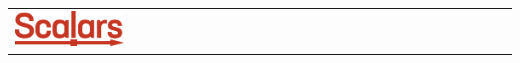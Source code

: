 



    \noindent
    \begin{tabularx}{\textwidth}{X r}
        \hspace{-0.1in}
        \begin{adjustbox}{valign=t}
            \includegraphics[width=0.23\textwidth]{img/scalars_logo.png}
        \end{adjustbox}
        \multirow{3}{0.75\textwidth}{
            \raggedleft\large\textbf{\doctitle} \\
            \normalsize\docauthors \\
            \docinitiated
        }
    \end{tabularx}
    \hspace{0.2in}
    \makeatother
    

